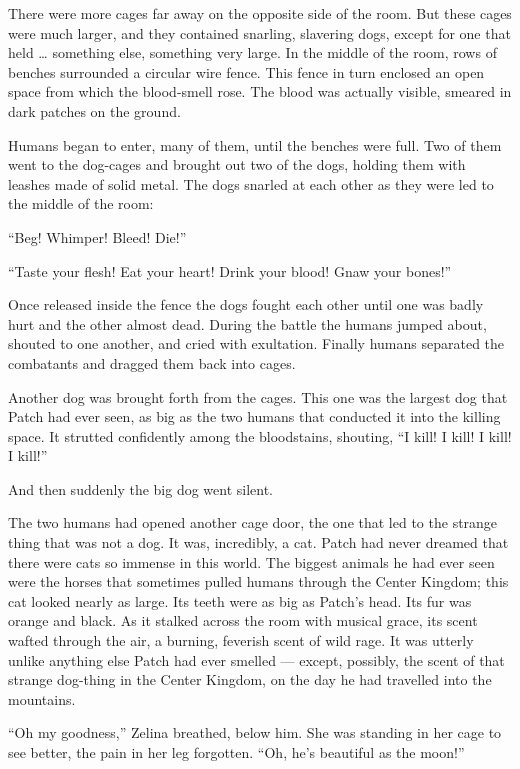 \documentclass[ebook,oneside,openany,17pt]{memoir}
\begin{document}
There were more cages far away on the opposite side of the room. But
these cages were much larger, and they contained snarling, slavering
dogs, except for one that held … something else, something very
large. In the middle of the room, rows of benches surrounded a
circular wire fence. This fence in turn enclosed an open space from
which the blood-smell rose. The blood was actually visible, smeared in
dark patches on the ground.

Humans began to enter, many of them, until the benches were full. Two
of them went to the dog-cages and brought out two of the dogs, holding
them with leashes made of solid metal. The dogs snarled at each other
as they were led to the middle of the room:

“Beg! Whimper! Bleed! Die!”

“Taste your flesh! Eat your heart! Drink your blood! Gnaw your bones!”

Once released inside the fence the dogs fought each other until one
was badly hurt and the other almost dead. During the battle the humans
jumped about, shouted to one another, and cried with
exultation. Finally humans separated the combatants and dragged them
back into cages.

Another dog was brought forth from the cages. This one was the largest
dog that Patch had ever seen, as big as the two humans that conducted
it into the killing space. It strutted confidently among the
bloodstains, shouting, “I kill! I kill! I kill! I kill!”

And then suddenly the big dog went silent.

The two humans had opened another cage door, the one that led to the
strange thing that was not a dog. It was, incredibly, a cat. Patch had
never dreamed that there were cats so immense in this world. The
biggest animals he had ever seen were the horses that sometimes pulled
humans through the Center Kingdom; this cat looked nearly as
large. Its teeth were as big as Patch’s head. Its fur was orange and
black. As it stalked across the room with musical grace, its scent
wafted through the air, a burning, feverish scent of wild rage. It was
utterly unlike anything else Patch had ever smelled — except,
possibly, the scent of that strange dog-thing in the Center Kingdom,
on the day he had travelled into the mountains.

“Oh my goodness,” Zelina breathed, below him. She was standing in her
cage to see better, the pain in her leg forgotten. “Oh, he’s beautiful
as the moon!”
\end{document}
